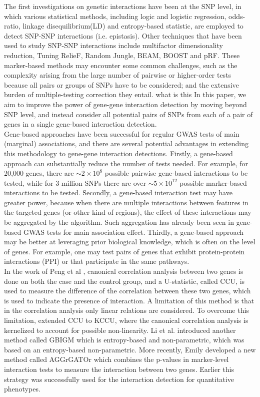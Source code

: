 \documentclass[11pt]{article}
\theoremstyle{plain}
\theoremstyle{definition}
\theoremstyle{remark}
\begin{document}
The first investigations on genetic interactions have been at the SNP level, in which various statistical methods, including logic and logistic regression, odds-ratio, linkage disequilibrium(LD) and entropy-based statistic, are employed to detect SNP-SNP interactions (i.e. epistasis). Other techniques that have been used to study SNP-SNP interactions include multifactor dimensionality reduction, Tuning RelieF, Random Jungle, BEAM, BOOST\cite{1} and pRF\cite{2}. These marker-based methods may encounter some common challenges, such as the complexity arising from the large number of pairwise or higher-order tests because all pairs or groups of SNPs have to be considered; and the extensive burden of multiple-testing correction they entail. {\color{red}what is this} In this paper, we aim to improve the power of gene-gene interaction detection by moving beyond SNP level, and instead consider all potential pairs of SNPs from each of a pair of genes in a single gene-based interaction detection.\\

Gene-based approaches have been successful for regular GWAS tests of main (marginal) associations, and there are several potential advantages in extending this methodology to gene-gene interaction detections. Firstly, a gene-based approach can substantially reduce the number of tests needed. For example, for 20,000 genes, there are $\sim 2\times 10^8$ possible pairwise gene-based interactions to be tested, while for 3 million SNPs there are over $\sim 5\times 10^{12}$ possible marker-based interactions to be tested. Secondly, a gene-based interaction test may have greater power, because when there are multiple interactions between features in the targeted genes (or other kind of regions), the effect of these interactions may be aggregated by the algorithm. Such aggregation has already been seen in gene-based GWAS tests for main association effect. Thirdly, a gene-based approach may be better at leveraging prior biological knowledge, which is often on the level of genes. For example, one may test pairs of genes that exhibit protein-protein interactions (PPI) or that participate in the same pathways.\\


In the work of Peng et al \cite{3}, canonical correlation analysis between two genes is done on both the case and the control group, and a U-statistic, called CCU, is used to measure the difference of the correlation between these two genes, which is used to indicate the presence of interaction. A limitation of this method is that in the correlation analysis only linear relations are considered. To overcome this limitation, \cite{4,5} extended CCU to KCCU, where the canonical correlation analysis is kernelized to account for possible non-linearity. Li et al. \cite{6} introduced another method called GBIGM which is entropy-based and non-parametric, which was based on an entropy-based non-parametric. More recently, Emily \cite{7} developed a new method called AGGrGATOr which combines the p-values in marker-level interaction tests to measure the interaction between two genes. Earlier\cite{8} this strategy was successfully used for the interaction detection for quantitative phenotypes.\\
\end{document}
